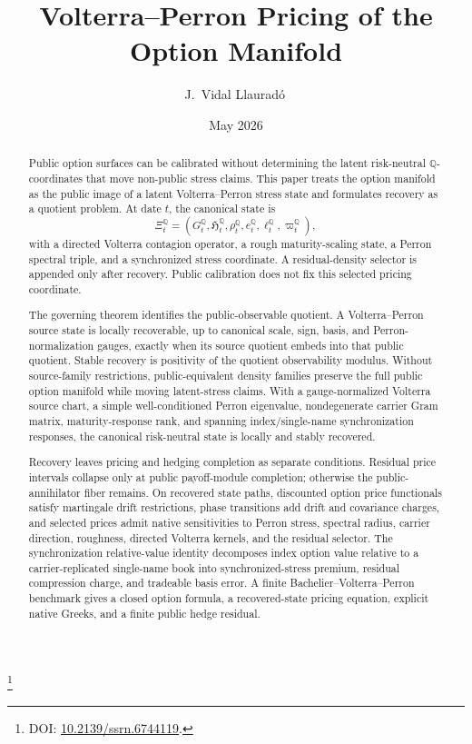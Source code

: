 \documentclass[11pt,a4paper]{amsart}
\theoremstyle{plain}
\theoremstyle{definition}
\theoremstyle{remark}
\newcommand{\QQ}{\mathbb{Q}}
\begin{document}
\title[Volterra-Perron Pricing]{%
Volterra--Perron Pricing of the Option Manifold}
\author[J.~Vidal Llaurad\'o]{J.~Vidal Llaurad\'o\,}
\thanks{DOI: \href{https://doi.org/10.2139/ssrn.6744119}{10.2139/ssrn.6744119}.}
\date{May 2026}


\begin{abstract}
Public option surfaces can be calibrated without determining the latent risk-neutral \(\QQ\)-coordinates
that move non-public stress claims.  This paper treats the option manifold as the public image of a
latent Volterra--Perron stress state and formulates recovery as a quotient problem.  At date \(t\),
the canonical state is
\[
        \Xi_t^\QQ
        =
        (G_t^\QQ,\mathfrak{H}_t^\QQ,\rho_t^\QQ,e_t^\QQ,\ell_t^\QQ,\varpi_t^\QQ),
\]
with a directed Volterra contagion operator, a rough maturity-scaling state, a Perron spectral
triple, and a synchronized stress coordinate.  A residual-density selector is appended only after
recovery.  Public calibration does not fix this selected pricing coordinate.

The governing theorem identifies the public-observable quotient.  A Volterra--Perron source state is
locally recoverable, up to canonical scale, sign, basis, and Perron-normalization gauges, exactly
when its source quotient embeds into that public quotient.  Stable recovery is positivity of the
quotient observability modulus.  Without source-family restrictions, public-equivalent density
families preserve the full public option manifold while moving latent-stress claims.  With a
gauge-normalized Volterra source chart, a simple well-conditioned Perron eigenvalue,
nondegenerate carrier Gram matrix, maturity-response rank, and spanning index/single-name
synchronization responses, the canonical risk-neutral state is locally and stably recovered.

Recovery leaves pricing and hedging completion as separate conditions.  Residual price intervals
collapse only at public payoff-module completion; otherwise the public-annihilator fiber remains.  On recovered state
paths, discounted option price functionals satisfy martingale drift restrictions, phase transitions
add drift and covariance charges, and selected prices admit native sensitivities to Perron stress,
spectral radius, carrier direction, roughness, directed Volterra kernels, and the residual
selector.  The synchronization relative-value identity decomposes index option value relative to a
carrier-replicated single-name book into synchronized-stress premium, residual compression charge,
and tradeable basis error.  A finite Bachelier--Volterra--Perron benchmark gives a closed option
formula, a recovered-state pricing equation, explicit native Greeks, and a finite public hedge
residual.
\end{abstract}
\end{document}
